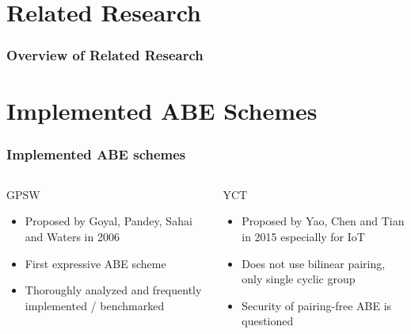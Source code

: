 
\section{Related Research}
\begin{frame}[c]
    \frametitle{Overview of Related Research}
    \begin{center}
        
    \end{center}
\end{frame}

\section{Implemented ABE Schemes}
\begin{frame}[c]
    \frametitle{Implemented ABE schemes}
    \begin{columns}[c]\centering
        \begin{block}{\centering GPSW}
            \centering
            \begin{itemize}
                \item Proposed by Goyal, Pandey, Sahai and Waters in 2006
                \item First expressive ABE scheme
                \item Thoroughly analyzed and frequently implemented / benchmarked
            \end{itemize}
        \end{block}

        \begin{block}{\centering YCT}
            \centering
            \begin{itemize}
                \item Proposed by Yao, Chen and Tian in 2015 especially for IoT
                \item Does not use bilinear pairing, only single cyclic group
                \item Security of pairing-free ABE is questioned
            \end{itemize}
        \end{block}
        
    \end{columns}
\end{frame}


